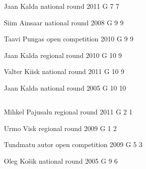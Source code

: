 \documentclass[11pt]{article}
\begin{document}
\ylDisplay{} %
{Jaan Kalda} %
{national round} %
{2011} %
{G 7} %
{7} %
{

\ifEngStatement
\fi
}

\ylDisplay{} %
{Siim Ainsaar} %
{national round} %
{2008} %
{G 9} %
{9} %
{

\ifEngStatement
\fi
}

\ylDisplay{} %
{Taavi Pungas} %
{open competition} %
{2010} %
{G 9} %
{9} %
{

\ifEngStatement
\fi
}

\ylDisplay{} %
{Jaan Kalda} %
{regional round} %
{2010} %
{G 10} %
{9} %
{

\ifEngStatement
\fi
}

\ylDisplay{} %
{Valter Kiisk} %
{national round} %
{2011} %
{G 10} %
{9} %
{

\ifEngStatement
\fi
}

\ylDisplay{} %
{Jaan Kalda} %
{national round} %
{2005} %
{G 10} %
{10} %
{

\ifEngStatement
\fi
}
\newpage\subsection{\protect{}}

\ylDisplay{} %
{Mihkel Pajusalu} %
{regional round} %
{2011} %
{G 2} %
{1} %
{

\ifEngStatement
\fi
}

\ylDisplay{} %
{Urmo Visk} %
{regional round} %
{2009} %
{G 1} %
{2} %
{

\ifEngStatement
\fi
}

\ylDisplay{} %
{Tundmatu autor} %
{open competition} %
{2009} %
{G 5} %
{3} %
{

\ifEngStatement
\fi
}

\ylDisplay{} %
{Oleg Košik} %
{national round} %
{2005} %
{G 9} %
{6} %
{

\ifEngStatement
\fi
}
\end{document}
